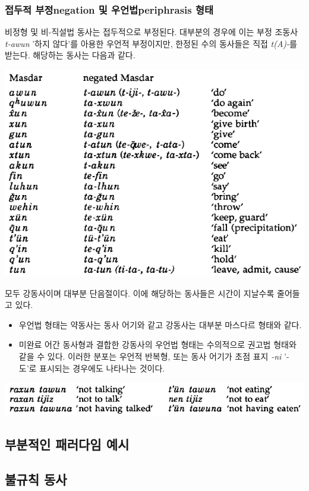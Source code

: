 \subsubsection{접두적 부정negation 및 우언법periphrasis 형태}
비정형 및 비-직설법 동사는 접두적으로 부정된다. 대부분의 경우에 이는 부정 조동사 \textit{t-awun} '하지 않다'를 아용한 우언적 부정이지만, 한정된 수의 동사들은 직접 \textit{t(A)-}를 받는다. 해당하는 동사는 다음과 같다.
\begin{center}
\includegraphics{Lezgian/src/prne.png}
\end{center}
모두 강동사이며 대부분 단음절이다. 이에 해당하는 동사들은 시간이 지날수록 줄어들고 있다.
\begin{itemize}
	\item 우언법 형태는 약동사는 동사 어기와 같고 강동사는 대부분 마스다르 형태와 같다.
	\item 미완료 어간 동사형과 결합한 강동사의 우언법 형태는 수의적으로 권고법 형태와 같을 수 있다. 이러한 분포는 우언적 반복형, 또는 동사 어기가 초점 표지 \textit{-ni} '-도'로 표시되는 경우에도 나타나는 것이다.
\end{itemize}
\begin{center}
\includegraphics{Lezgian/src/peri.png}
\end{center}
\subsection{부분적인 패러다임 예시}
\omission
\subsection{불규칙 동사}
